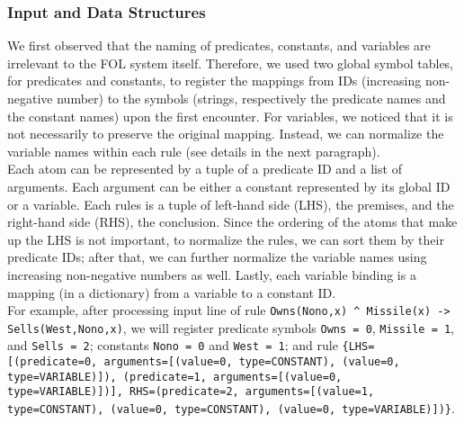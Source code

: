 \documentclass[letterpaper]{article}
\begin{document}
\subsubsection{Input and Data Structures}
We first observed that the naming of predicates, constants, and variables are irrelevant to the FOL system itself. Therefore, we used two global symbol tables, for predicates and constants, to register the mappings from IDs (increasing non-negative number) to the symbols (strings, respectively the predicate names and the constant names) upon the first encounter. For variables, we noticed that it is not necessarily to preserve the original mapping. Instead, we can normalize the variable names within each rule (see details in the next paragraph).\\
Each atom can be represented by a tuple of a predicate ID and a list of arguments. Each argument can be either a constant represented by its global ID or a variable. Each rules is a tuple of left-hand side (LHS), the premises, and the right-hand side (RHS), the conclusion. Since the ordering of the atoms that make up the LHS is not important, to normalize the rules, we can sort them by their predicate IDs; after that, we can further normalize the variable names using increasing non-negative numbers as well. Lastly, each variable binding is a mapping (in a dictionary) from a variable to a constant ID.\\
For example, after processing input line of rule \texttt{Owns(Nono,x) \string^ Missile(x) -> Sells(West,Nono,x)}, we will register predicate symbols \texttt{Owns = 0}, \texttt{Missile = 1}, and \texttt{Sells = 2}; constants \texttt{Nono = 0} and \texttt{West = 1}; and rule \texttt{\{LHS=[(predicate=0, arguments=[(value=0, type=CONSTANT), (value=0, type=VARIABLE)]), (predicate=1, arguments=[(value=0, type=VARIABLE)])], RHS=(predicate=2, arguments=[(value=1, type=CONSTANT), (value=0, type=CONSTANT), (value=0, type=VARIABLE)])\}}.
\end{document}
